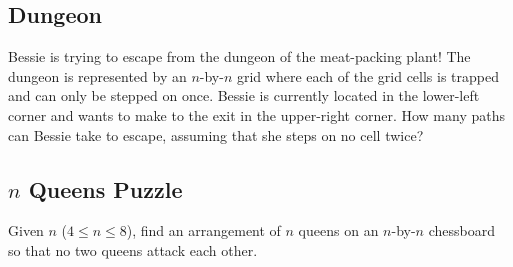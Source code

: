 \subsection{Dungeon}

\begin{typewriter}
  Bessie is trying to escape from the dungeon of the meat-packing plant! The dungeon is represented by an $n$-by-$n$ grid where each of the grid cells is trapped and can only be stepped on once. Bessie is currently located in the lower-left corner and wants to make to the exit in the upper-right corner. How many paths can Bessie take to escape, assuming that she steps on no cell twice?
\end{typewriter}

\subsection{$n$ Queens Puzzle}

\begin{typewriter}
  Given $n$ ($4 \le n \le 8$), find an arrangement of $n$ queens on an $n$-by-$n$ chessboard so that no two queens attack each other. 
\end{typewriter}

\begin{typewriter}
\end{typewriter}
